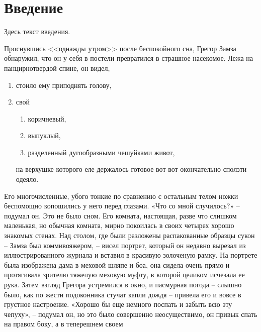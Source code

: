 
\newcommand{\No}{\textnumero}







\maketitle

\tableofcontents

\section*{Введение}
Здесь текст введения.

Проснувшись <<однажды утром>> после беспокойного сна, Грегор Замза обнаружил, что он у себя в постели превратился в страшное насекомое. 
Лежа на панцирнотвердой спине, он видел,

\begin{enumerate}
   \item стоило ему приподнять голову, 
   \item свой 
   \begin{enumerate}
      \item коричневый, 
      \item выпуклый, 
      \item разделенный дугообразными чешуйками живот, 
   \end{enumerate}
   
   на верхушке которого еле держалось готовое вот-вот окончательно сползти одеяло. 
   
\end{enumerate}

Его многочисленные, убого тонкие по сравнению с остальным телом ножки беспомощно копошились у него перед глазами. «Что со мной случилось?» – подумал он. Это не было сном. Его комната, настоящая, разве что слишком маленькая, но обычная комната, мирно покоилась в своих четырех хорошо знакомых стенах. Над столом, где были разложены распакованные образцы сукон – Замза был коммивояжером, – висел портрет, который он недавно вырезал из иллюстрированного журнала и вставил в красивую золоченую рамку. На портрете была изображена дама в меховой шляпе и боа, она сидела очень прямо и протягивала зрителю тяжелую меховую муфту, в которой целиком исчезала ее рука. Затем взгляд Грегора устремился в окно, и пасмурная погода – слышно было, как по жести подоконника стучат капли дождя – привела его и вовсе в грустное настроение. «Хорошо бы еще немного поспать и забыть всю эту чепуху», – подумал он, но это было совершенно неосуществимо, он привык спать на правом боку, а в теперешнем своем





